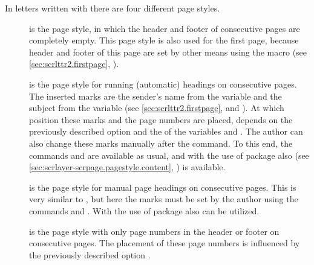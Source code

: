 \begin{Declaration}
\end{Declaration}%
In letters written with  there are four different
page styles.
\begin{description}
\item[{%
    }] is the page
  style, in which the header and footer of consecutive pages are completely
  empty. This page style is also used for the first page, because header and
  footer of this page are set by other means using the macro
   (see \autoref{sec:scrlttr2.firstpage},
  ).
\item[{%
    }] is the page
  style for running (automatic) headings on consecutive pages. The inserted
  marks are the sender's name from the variable
   and the subject from the
  variable  (see
  \autoref{sec:scrlttr2.firstpage},
   and
  ).  At which position these
  marks and the page numbers are placed, depends on the previously described
  option  and the  of the variables
   and
  . The author can also change
  these marks manually after the  command. To this end, the
  commands  and  are available as usual, and
  with the use of package  also 
  (see \autoref{sec:scrlayer-scrpage.pagestyle.content},
  ) is available.
\item[{%
    }] is the
  page style for manual page headings on consecutive pages. This is very
  similar to , but here the marks must be set by the author
  using the commands  and
  .  With the use of package
   also  can be utilized.
\item[{%
    }] is the page
  style with only page numbers in the header or footer on consecutive
  pages. The placement of these page numbers is influenced by the previously
  described option .
\end{description}


